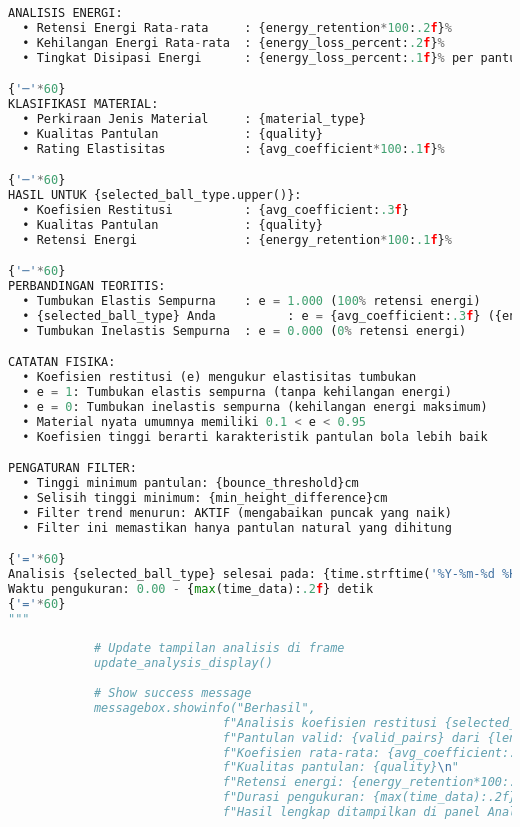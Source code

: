 \begin{itemize}
\begin{scriptsize}
\begin{lstlisting}[language=python]
ANALISIS ENERGI:
  • Retensi Energi Rata-rata     : {energy_retention*100:.2f}%
  • Kehilangan Energi Rata-rata  : {energy_loss_percent:.2f}%
  • Tingkat Disipasi Energi      : {energy_loss_percent:.1f}% per pantulan

{'─'*60}
KLASIFIKASI MATERIAL:
  • Perkiraan Jenis Material     : {material_type}
  • Kualitas Pantulan            : {quality}
  • Rating Elastisitas           : {avg_coefficient*100:.1f}%

{'─'*60}
HASIL UNTUK {selected_ball_type.upper()}:
  • Koefisien Restitusi          : {avg_coefficient:.3f}
  • Kualitas Pantulan            : {quality}
  • Retensi Energi               : {energy_retention*100:.1f}%

{'─'*60}
PERBANDINGAN TEORITIS:
  • Tumbukan Elastis Sempurna    : e = 1.000 (100% retensi energi)
  • {selected_ball_type} Anda          : e = {avg_coefficient:.3f} ({energy_retention*100:.1f}% retensi energi)
  • Tumbukan Inelastis Sempurna  : e = 0.000 (0% retensi energi)

CATATAN FISIKA:
  • Koefisien restitusi (e) mengukur elastisitas tumbukan
  • e = 1: Tumbukan elastis sempurna (tanpa kehilangan energi)
  • e = 0: Tumbukan inelastis sempurna (kehilangan energi maksimum)
  • Material nyata umumnya memiliki 0.1 < e < 0.95
  • Koefisien tinggi berarti karakteristik pantulan bola lebih baik

PENGATURAN FILTER:
  • Tinggi minimum pantulan: {bounce_threshold}cm
  • Selisih tinggi minimum: {min_height_difference}cm
  • Filter trend menurun: AKTIF (mengabaikan puncak yang naik)
  • Filter ini memastikan hanya pantulan natural yang dihitung

{'='*60}
Analisis {selected_ball_type} selesai pada: {time.strftime('%Y-%m-%d %H:%M:%S')}
Waktu pengukuran: 0.00 - {max(time_data):.2f} detik
{'='*60}
"""
            
            # Update tampilan analisis di frame
            update_analysis_display()
            
            # Show success message
            messagebox.showinfo("Berhasil", 
                              f"Analisis koefisien restitusi {selected_ball_type} selesai!\n\n"
                              f"Pantulan valid: {valid_pairs} dari {len(heights)} (trend menurun)\n"
                              f"Koefisien rata-rata: {avg_coefficient:.3f}\n"
                              f"Kualitas pantulan: {quality}\n"
                              f"Retensi energi: {energy_retention*100:.1f}%\n"
                              f"Durasi pengukuran: {max(time_data):.2f} detik\n\n"
                              f"Hasil lengkap ditampilkan di panel Analisis Real-time")
            

\end{lstlisting}
\end{scriptsize}
\end{itemize}
